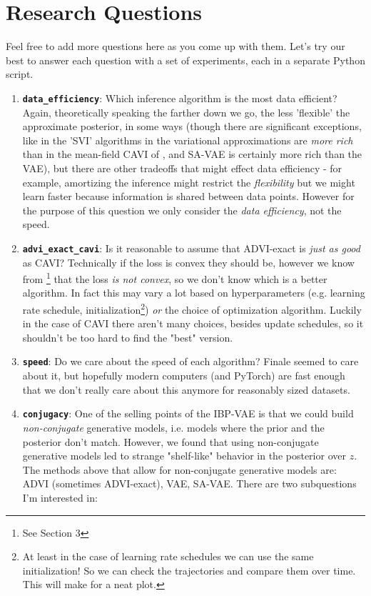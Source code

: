 \documentclass[a4paper, 11pt]{article}
\begin{document}
\section{Research Questions}
Feel free to add more questions here as you come up with them. Let's try our best to answer each question with a set of experiments, each in a separate Python script.
\begin{enumerate}
    \item \textbf{\texttt{data\_efficiency}}: Which inference algorithm is the most data efficient? Again, theoretically speaking the farther down we go, the less 'flexible' the approximate posterior, in some ways (though there are significant exceptions, like in the 'SVI' algorithms in \citet{shah2015empirical} the variational approximations are \emph{more rich} than in the mean-field CAVI of \citet{doshi2009variational}, and SA-VAE is certainly more rich than the VAE), but there are other tradeoffs that might effect data efficiency - for example, amortizing the inference might restrict the \emph{flexibility} but we might learn faster because information is shared between data points. However for the purpose of this question we only consider the \emph{data efficiency}, not the speed.
    \item \textbf{\texttt{advi\_exact\_cavi}}: Is it reasonable to assume that ADVI-exact is \emph{just as good} as CAVI? Technically if the loss is convex they should be, however we know from \citet{doshi2009report}\footnote{See Section 3} that the loss \emph{is not convex}, so we don't know which is a better algorithm. In fact this may vary a lot based on hyperparameters (e.g. learning rate schedule, initialization\footnote{At least in the case of learning rate schedules we can use the same initialization! So we can check the trajectories and compare them over time. This will make for a neat plot.}) \emph{or} the choice of optimization algorithm. Luckily in the case of CAVI there aren't many choices, besides update schedules, so it shouldn't be too hard to find the "best" version.
    \item \textbf{\texttt{speed}}: Do we care about the speed of each algorithm? Finale seemed to care about it, but hopefully modern computers (and PyTorch) are fast enough that we don't really care about this anymore for reasonably sized datasets.
    \item \textbf{\texttt{conjugacy}}: One of the selling points of the IBP-VAE is that we could build \emph{non-conjugate} generative models, i.e. models where the prior and the posterior don't match. However, we found that using non-conjugate generative models led to strange "shelf-like" behavior in the posterior over $z$. The methods above that allow for non-conjugate generative models are: ADVI (sometimes ADVI-exact), VAE, SA-VAE. There are two subquestions I'm interested in:

\end{enumerate}
\end{document}
